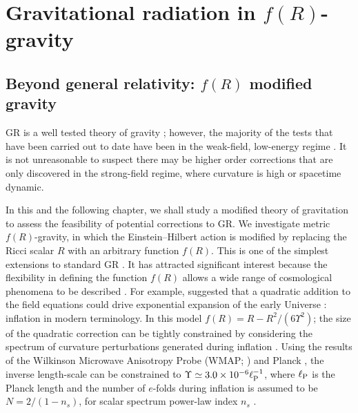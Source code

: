 \chapter{Gravitational radiation in $f(R)$-gravity}\label{ch:f-R1}

\section{Beyond general relativity: $f(R)$ modified gravity}

GR is a well tested theory of gravity \citep{Will2006}; however, the majority of the tests that have been carried out to date have been in the weak-field, low-energy regime \citep{Will1993,Psaltis2008a}. It is not unreasonable to suspect there may be higher order corrections that are only discovered in the strong-field regime, where curvature is high or spacetime dynamic.

In this and the following chapter, we shall study a modified theory of gravitation to assess the feasibility of potential corrections to GR. We investigate metric $f(R)$-gravity, in which the Einstein--Hilbert action is modified by replacing the Ricci scalar $R$ with an arbitrary function $f(R)$. This is one of the simplest extensions to standard GR \citep{Sotiriou2010, DeFelice2010}. It has attracted significant interest because the flexibility in defining the function $f(R)$ allows a wide range of cosmological phenomena to be described \citep{Nojiri2007, Capozziello2007a}. For example, \citet{Starobinsky1980} suggested that a quadratic addition to the field equations could drive exponential expansion of the early Universe \citep{Vilenkin1985}: inflation in modern terminology. In this model $f(R) = R - R^2/(6\Upsilon^2)$; the size of the quadratic correction can be tightly constrained by considering the spectrum of curvature perturbations generated during inflation \citep{Starobinskii1983, Starobinskii1985}. Using the results of the Wilkinson Microwave Anisotropy Probe (WMAP; \citealt{Bennett2012, Hinshaw2012}) and Planck \citep{Ade2013a,Ade2013b}, the inverse length-scale can be constrained to $\Upsilon \simeq 3.0 \times 10^{-6} \ell_\mathrm{P}^{-1}$, where $\ell_\mathrm{P}$ is the Planck length and the number of $e$-folds during inflation is assumed to be $N = 2/(1 - n_s)$, for scalar spectrum power-law index $n_s$ \citep{Starobinsky2007, DeFelice2010}. %

